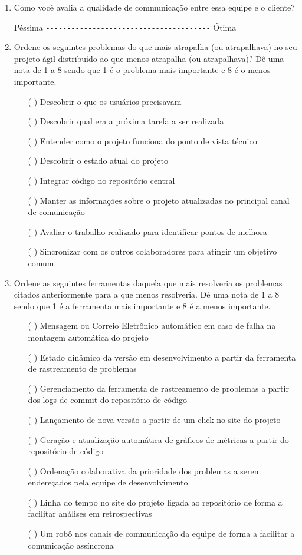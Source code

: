 \begin{enumerate}
\item Como você avalia a qualidade de communicação entre essa equipe e
  o cliente?

  Péssima \verb=---------------------------------------= Ótima

\item Ordene os seguintes problemas do que mais atrapalha (ou
  atrapalhava) no seu projeto ágil distribuído ao que menos atrapalha
  (ou atrapalhava)? Dê uma nota de 1 a 8 sendo que 1 é o problema mais
  importante e 8 é o menos importante.
  \begin{itemize}
  \item[( )] Descobrir o que os usuários precisavam
  \item[( )] Descobrir qual era a próxima tarefa a ser realizada
  \item[( )] Entender como o projeto funciona do ponto de vista
    técnico
  \item[( )] Descobrir o estado atual do projeto
  \item[( )] Integrar código no repositório central
  \item[( )] Manter as informações sobre o projeto atualizadas no
    principal canal de comunicação
  \item[( )] Avaliar o trabalho realizado para identificar pontos de
    melhora
  \item[( )] Sincronizar com os outros colaboradores para atingir um
    objetivo comum
  \end{itemize}

\item Ordene as seguintes ferramentas daquela que mais resolveria os
  problemas citados anteriormente para a que menos resolveria. Dê uma
  nota de 1 a 8 sendo que 1 é a ferramenta mais importante e 8 é a
  menos importante.
  \begin{itemize}
  \item[( )] Mensagem ou Correio Eletrônico automático em caso de
    falha na montagem automática do projeto
  \item[( )] Estado dinâmico da versão em desenvolvimento a partir da
    ferramenta de rastreamento de problemas
  \item[( )] Gerenciamento da ferramenta de rastreamento de problemas
    a partir dos logs de commit do repositório de código
  \item[( )] Lançamento de nova versão a partir de um click no site do
    projeto
  \item[( )] Geração e atualização automática de gráficos de métricas
    a partir do repositório de código
  \item[( )] Ordenação colaborativa da prioridade dos problemas a
    serem endereçados pela equipe de desenvolvimento
  \item[( )] Linha do tempo no site do projeto ligada ao repositório
    de forma a facilitar análises em retrospectivas
  \item[( )] Um robô nos canais de communicação da equipe de forma a
    facilitar a comunicação assíncrona
  \end{itemize}


\end{enumerate}
